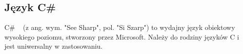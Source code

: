 \subsection{Język C\#}

C\# ~\cite{csharpDocs} (z ang. wym. "See Sharp", pol. "Si Szarp") to wydajny język obiektowy wysokiego poziomu, 
stworzony przez Microsoft.
Należy do rodziny języków C i jest uniwersalny w zastosowaniu.